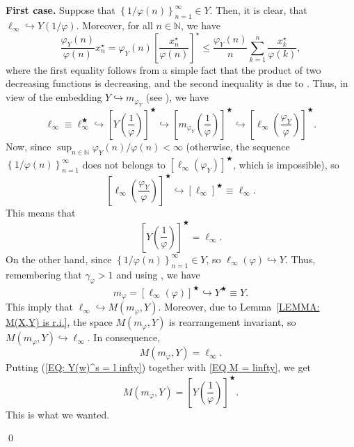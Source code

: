 \documentclass[11pt]{amsart}
\theoremstyle{definition}
\theoremstyle{definition}
\theoremstyle{definition}
\theoremstyle{definition}
\theoremstyle{definition}
\theoremstyle{definition}
\theoremstyle{definition}
\theoremstyle{definition}
\numberwithin{equation}{section}
\numberwithin{equation}{section}
\numberwithin{equation}{section}
\theoremstyle{definition}
\theoremstyle{definition}
\theoremstyle{definition}
\theoremstyle{definition}
\theoremstyle{definition}
\theoremstyle{definition}
\renewenvironment{proof}{\noindent {\bf Proof.}}{\qed}
\begin{document}
\begin{proof}
			{\bf First case.} Suppose that $\left\{ 1 / \varphi(n) \right\}_{n=1}^{\infty} \in Y$.
			Then, it is clear, that $\ell_{\infty} \hookrightarrow Y\left( 1 /\varphi \right)$.
			Moreover, for all $n \in \mathbb{N}$, we have
			\begin{equation*}
				 \frac{\varphi_Y(n)}{\varphi(n)}x_n^{\star}
				 	= \varphi_Y(n) \left[ \frac{x_n^{\star}}{\varphi(n)} \right]^{\star}
					\leqslant \frac{\varphi_Y(n)}{n} \sum_{k=1}^{n} \frac{x_k^{\star}}{\varphi(k)},
			\end{equation*}
			where the first equality follows from a simple fact that the product of two decreasing functions is decreasing,
			and the second inequality is due to \cite[Proposition~3.2, p.~52]{BS88}.
			Thus, in view of the embedding $Y \hookrightarrow m_{\varphi_Y}$ (see \cite[Proposition~5.1, p.~70]{BS88}), we have
			\begin{equation*}
				\ell_{\infty} \equiv \ell_{\infty}^{\bigstar} \hookrightarrow \left[ Y\left( \frac{1}{\varphi} \right) \right]^{\bigstar}
					\hookrightarrow \left[ m_{\varphi_Y}\left( \frac{1}{\varphi} \right) \right]^{\bigstar}
					\hookrightarrow \left[ \ell_{\infty}\left( \frac{\varphi_Y}{\varphi} \right) \right]^{\bigstar}.
			\end{equation*}
			Now, since $\sup_{n \in \mathbb{N}} \varphi_Y(n) / \varphi(n) < \infty$ (otherwise, the sequence $\left\{ 1 / \varphi(n) \right\}_{n=1}^{\infty}$
			does not belongs to $\left[ \ell_{\infty}(\varphi_Y) \right]^{\bigstar}$, which is impossible), so
			\begin{equation*}
				\left[ \ell_{\infty}\left( \frac{\varphi_Y}{\varphi} \right) \right]^{\bigstar} \hookrightarrow [\ell_{\infty}]^{\bigstar} \equiv \ell_{\infty}.
			\end{equation*}
			This means that
			\begin{equation} \label{EQ: Y(w)^s = l infty}
				\left[ Y\left( \frac{1}{\varphi} \right) \right]^{ \bigstar } = \ell_{\infty}.
			\end{equation}
			On the other hand, since $\left\{ 1 / \varphi(n) \right\}_{n=1}^{\infty} \in Y$, so $\ell_{\infty}(\varphi) \hookrightarrow Y$.
			Thus, remembering that $\gamma_{\varphi} > 1$ and using \cite[Theorem~5.3, p.~115]{KPS82}, we have
			\begin{equation*}
				m_{\varphi} = \left[ \ell_{\infty}(\varphi) \right]^{\bigstar} \hookrightarrow Y^{\bigstar} \equiv Y.
			\end{equation*}
			This imply that $\ell_{\infty} \hookrightarrow M(m_{\varphi},Y)$.
			Moreover, due to Lemma~\ref{LEMMA: M(X,Y) is r.i.}, the space $M(m_{\varphi},Y)$ is rearrangement invariant,
			so $M(m_{\varphi},Y) \hookrightarrow \ell_{\infty}$. In consequence,
			\begin{equation} \label{EQ M = linfty}
				M(m_{\varphi},Y) = \ell_{\infty}.
			\end{equation}
			Putting (\ref{EQ: Y(w)^s = l infty}) together with \eqref{EQ M = linfty}, we get
			\begin{equation*}
				M(m_{\varphi},Y) = \left[ Y\left( \frac{1}{\varphi} \right) \right]^{\bigstar}.
			\end{equation*}
			This is what we wanted.
			

\end{proof}
\end{document}
